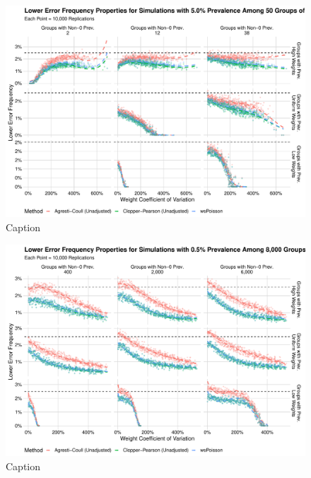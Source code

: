 \documentclass[AMA,STIX1COL]{WileyNJD-v2}
\begin{document}
\begin{figure}
    \centering
    \includegraphics[width=\textwidth]{figures/perfect_lower_error_frequency_50_0_05_reduced.pdf}
    \caption{Caption}
    \label{fig:perfect_lower_error_frequency_50_0_05_reduced}
\end{figure}


\begin{figure}
    \centering
    \includegraphics[width=\textwidth]{figures/perfect_lower_error_frequency_8000_0_005_reduced.pdf}
    \caption{Caption}
    \label{fig:perfect_lower_error_frequency_8000_0_005_reduced}
\end{figure}
\end{document}
